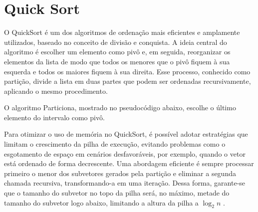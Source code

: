 \section{Quick Sort}
O QuickSort é um dos algoritmos de ordenação mais eficientes e amplamente utilizados, baseado no conceito de divisão e conquista. A ideia central do algoritmo é escolher um elemento como pivô e, em seguida, reorganizar os elementos da lista de modo que todos os menores que o pivô fiquem à sua esquerda e todos os maiores fiquem à sua direita. Esse processo, conhecido como partição, divide a lista em duas partes que podem ser ordenadas recursivamente, aplicando o mesmo procedimento.


O algoritmo Particiona, mostrado no pseudocódigo abaixo, escolhe o último elemento do intervalo como pivô.







Para otimizar o uso de memória no QuickSort, é possível adotar estratégias que limitam o crescimento da pilha de execução, evitando problemas como o esgotamento de espaço em cenários desfavoráveis, por exemplo, quando o vetor está ordenado de forma decrescente. Uma abordagem eficiente é sempre processar primeiro o menor dos subvetores gerados pela partição e eliminar a segunda chamada recursiva, transformando-a em uma iteração. Dessa forma, garante-se que o tamanho do subvetor no topo da pilha será, no máximo, metade do tamanho do subvetor logo abaixo, limitando a altura da pilha a $\log_2 n$ \cite[p.~89--90]{book97338b4c}.


